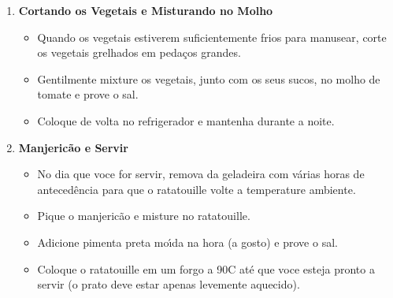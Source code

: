 \documentclass [11pt, letterpaper] {article}
\newcommand \fileName {GrilledRatatouille}
\begin{document}
\begin{description}
\begin{enumerate}
\begin{itemize}
		\item Grelhe as abrobinhas ate' que elas estejam grelhadas mas ainda com uma consist\^encia firme, vire com uma espatula met\'alica. 
		\item Quando remover da grelha, coloque em uma tigela e cubra para elas continuem cozinhando enquanto esfriam.
	\end{itemize}
	\item {\bf Cortando os Vegetais e Misturando no Molho}
	\begin{itemize}	
		\item Quando os vegetais estiverem suficientemente frios para manusear, corte os vegetais grelhados em peda\c{c}os grandes. 
		\item Gentilmente mixture os vegetais, junto com os seus sucos, no molho de tomate e prove o sal.
		\item Coloque de volta no refrigerador e mantenha durante a noite.
	\end{itemize}
	\item{\bf Manjeric\~ao e Servir}
	\begin{itemize}	
		\item No dia que voce for servir, remova da geladeira com v\'arias horas de anteced\^encia para que o ratatouille volte a temperature ambiente.
		\item Pique o manjeric\~ao e misture no ratatouille.
		\item Adicione pimenta preta mo\'{\i}da na hora (a gosto) e prove o sal.
		\item Coloque o  ratatouille em um forgo a 90C at\'e que voce esteja pronto a servir (o prato deve estar apenas levemente aquecido).
	\end{itemize}	
     	\end{enumerate}         
\end{description}

\end{document}
